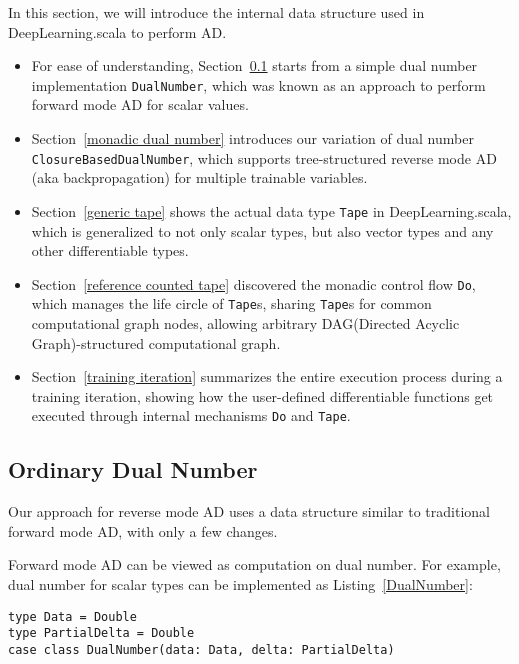 In this section, we will introduce the internal data structure used in DeepLearning.scala to perform AD.

\begin{itemize}

  \item For ease of understanding, Section~\ref{dual number} starts from a simple dual number implementation \lstinline{DualNumber}, which was known as an approach to perform forward mode AD for scalar values.
  
  \item Section~\ref{monadic dual number} introduces our variation of dual number \lstinline{ClosureBasedDualNumber}, which supports tree-structured reverse mode AD (aka backpropagation) for multiple \glspl{trainable variable}.

  \item Section~\ref{generic tape} shows the actual data type \lstinline{Tape} in DeepLearning.scala, which is generalized to not only scalar types, but also vector types and any other differentiable types.

  \item Section~\ref{reference counted tape} discovered the monadic control flow \lstinline{Do}, which manages the life circle of \lstinline{Tape}s, sharing \lstinline{Tape}s for common \gls{computational graph} nodes, allowing arbitrary DAG(Directed Acyclic Graph)-structured \gls{computational graph}.

  \item Section~\ref{training iteration} summarizes the entire execution process during a training iteration, showing how the user-defined \glspl{differentiable function} get executed through internal mechanisms \lstinline{Do} and \lstinline{Tape}.

\end{itemize}

\subsection{Ordinary Dual Number}
\label{dual number}

Our approach for reverse mode AD uses a data structure similar to traditional forward mode AD, with only a few changes.

Forward mode AD can be viewed as computation on dual number. For example, dual number for scalar types can be implemented as Listing~\ref{DualNumber}:

\begin{lstlisting}[float={h t b p},caption={Dual number for forward mode AD}, label={DualNumber}]
type Data = Double
type PartialDelta = Double
case class DualNumber(data: Data, delta: PartialDelta)
\end{lstlisting}

